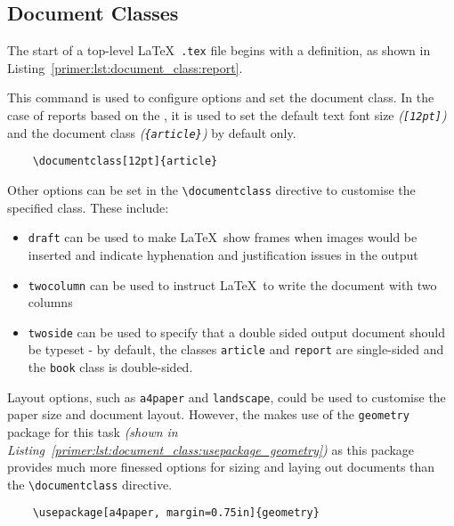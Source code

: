 \subsection{Document Classes}
The start of a top-level \LaTeX\ \texttt{.tex} file begins with a  definition, as shown in Listing~\ref{primer:lst:document_class:report}.

This command is used to configure options and set the document class. In the case of reports based on the \uswdwmspkg{}, it is used to set the default text font size \textit{(\texttt{[12pt]})} and the document class \textit{(\texttt{\{article\}})} by default only.

\begin{listing}[H]
  \captionsetup{skip=\skiplistingcaptionlen}
  \begin{verbatim}
    \documentclass[12pt]{article}
  \end{verbatim}
  \caption{\texttt{\textbackslash documentclass} command example}
  \label{primer:lst:document_class:report}
\end{listing}

Other options can be set in the \texttt{\textbackslash documentclass} directive to customise the specified class. These include:

\begin{itemize}
  \item \texttt{draft} can be used to make \LaTeX\ show frames when images would be inserted and indicate hyphenation and justification issues in the output
  \item \texttt{twocolumn} can be used to instruct \LaTeX\ to write the document with two columns
  \item \texttt{twoside} can be used to specify that a double sided output document should be typeset - by default, the classes \texttt{article} and \texttt{report} are single-sided and the \texttt{book} class is double-sided.
\end{itemize}

Layout options, such as \texttt{a4paper} and \texttt{landscape}, could be used to customise the paper size and document layout. However, the \uswdwmspkg{} makes use of the \texttt{geometry} package for this task \textit{(shown in Listing~\ref{primer:lst:document_class:usepackage_geometry})} as this package provides much more finessed options for sizing and laying out documents than the \texttt{\textbackslash documentclass} directive.

\begin{listing}[H]
  \captionsetup{skip=\skiplistingcaptionlen}
  \begin{verbatim}
    \usepackage[a4paper, margin=0.75in]{geometry}
  \end{verbatim}
  \caption{\texttt{geometry} package import and configuration example}
  \label{primer:lst:document_class:usepackage_geometry}
\end{listing}

